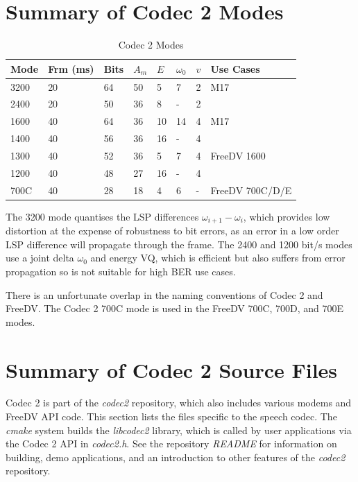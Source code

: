 \documentclass{article}
\begin{document}
{\section{Summary of Codec 2 Modes}
\label{sect:codec2_modes}

\begin{table}[H]
\label{tab:codec2_modes}
\centering
\begin{tabular}{p{0.75cm}|p{0.75cm}|p{0.5cm}|p{0.5cm}|p{0.5cm}|p{0.5cm}|p{0.5cm}|p{3cm}}
\hline
Mode & Frm (ms) & Bits & $A_m$ & $E$ & $\omega_0$ & $v$ & Use Cases \\
\hline
3200 & 20 & 64 & 50 & 5  & 7  & 2 & M17 \\
2400 & 20 & 50 & 36 & 8  & -  & 2 \\
1600 & 40 & 64 & 36 & 10 & 14 & 4 & M17 \\
1400 & 40 & 56 & 36 & 16 & -  & 4 \\
1300 & 40 & 52 & 36 & 5  & 7  & 4 & FreeDV 1600 \\
1200 & 40 & 48 & 27 & 16 & -  & 4 & \\
700C & 40 & 28 & 18 & 4  & 6  & - & FreeDV 700C/D/E \\
\hline
\end{tabular}
\caption{Codec 2 Modes}
\end{table}

The 3200 mode quantises the LSP differences $\omega_{i+1}-\omega_i$, which provides low distortion at the expense of robustness to bit errors, as an error in a low order LSP difference will propagate through the frame.  The 2400 and 1200 bit/s modes use a joint delta $\omega_0$ and energy VQ, which is efficient but also suffers from error propagation so is not suitable for high BER use cases.

There is an unfortunate overlap in the naming conventions of Codec 2 and FreeDV.  The Codec 2 700C mode is used in the FreeDV 700C, 700D, and 700E modes.

\section{Summary of Codec 2 Source Files}
\label{sect:source_files}

Codec 2 is part of the \emph{codec2} repository, which also includes various modems and FreeDV API code.  This section lists the files specific to the speech codec. The \emph{cmake} system builds the \emph{libcodec2} library, which is called by user applications via the Codec 2 API in \emph{codec2.h}.  See the repository \emph{README} for information on building, demo applications, and an introduction to other features of the \emph{codec2} repository.
 
}
\end{document}

